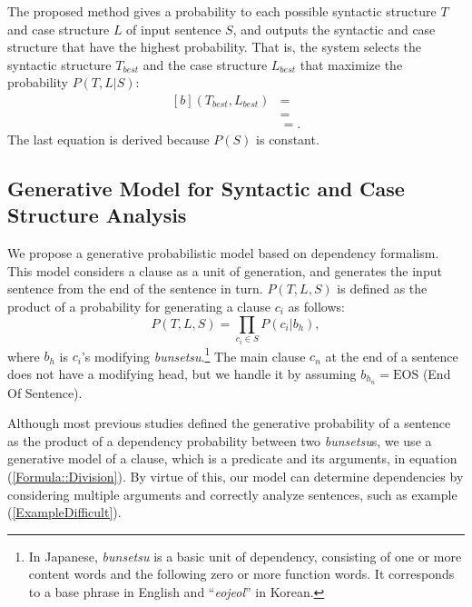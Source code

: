 \documentclass[english]{jnlp_1.4_rep}
\newcommand{\argmax}[2]{}
\begin{document}
The proposed method gives a probability to each possible syntactic
structure $T$ and case structure $L$ of input sentence $S$, and
outputs the syntactic and case structure that have the highest
probability. That is, the system selects the syntactic structure
$T_{best}$ and the case structure $L_{best}$ that maximize the
probability $P(T,L|S)$:
\begin{equation}
\begin{aligned}[b]
 (T_{best}, L_{best}) & = \argmax{(T, L)}{P(T,L|S)} \\
                      & = \argmax{(T, L)}{\frac{P(T,L,S)}{P(S)}} \\
                      & = \argmax{(T, L)}{P(T,L,S)}.
\end{aligned}
\end{equation}
The last equation is derived because $P(S)$ is constant.


\subsection{Generative Model for Syntactic and Case Structure Analysis}

We propose a generative probabilistic model based on dependency
formalism. This model considers a clause as a unit of generation, and
generates the input sentence from the end of the sentence in
turn. $P(T,L,S)$ is defined as the product of a probability for
generating a clause $c_i$ as follows:
\begin{equation}
 P(T,L,S) = \prod_{c_i \in S} P(c_i|b_h),
\label{Formula::Division}
\end{equation}
where $b_h$ is $c_i$'s modifying \textit{bunsetsu}.\footnote{In Japanese, \textit{bunsetsu} is a
basic unit of dependency, consisting of one or more content words and
the following zero or more function words. It corresponds to a base
phrase in English and ``\textit{eojeol}'' in Korean.} The main clause
$c_n$ at the end of a sentence does not have a modifying head, but we
handle it by assuming $b_{h_n} = \mbox{EOS}$ (End Of Sentence).

Although most previous studies defined the generative probability of a
sentence as the product of a dependency probability between two
\textit{bunsetsu}s, we use a generative model of a clause, which is a
predicate and its arguments, in equation (\ref{Formula::Division}). By
virtue of this, our model can determine dependencies by considering
multiple arguments and correctly analyze sentences, such as example
(\ref{ExampleDifficult}).
\end{document}
